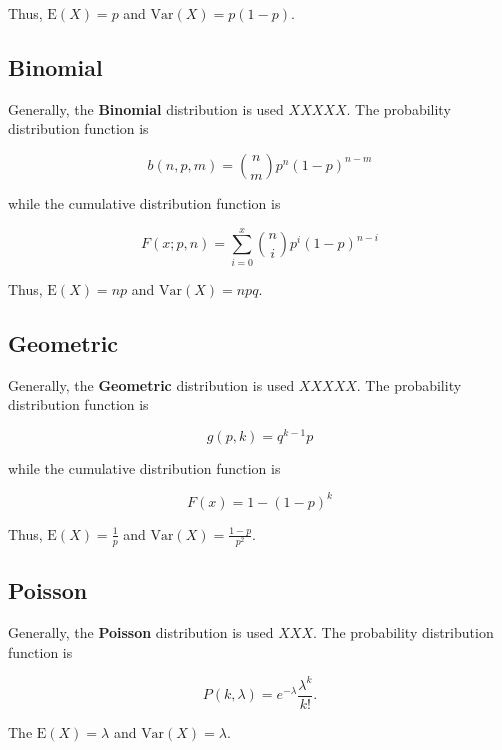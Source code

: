 \documentclass[12pt]{article}
\begin{document}
\noindent
Thus, $\text{E}(X) = p$ and $\text{Var}(X) = p(1-p)$.

\subsection*{Binomial}
\noindent
Generally, the \textbf{Binomial} distribution is used $XXXXX$. The probability distribution function is

\begin{equation*}
b(n,p,m) = {n \choose m} p^n (1-p)^{n-m}
\end{equation*}

\noindent
while the cumulative distribution function is

\begin{equation*}
F(x;p,n) = \sum_{i = 0}^{x} {n \choose i} p^i (1- p)^{n - i}
\end{equation*}

\noindent
Thus, $\text{E}(X) = np$ and $\text{Var}(X) = npq$.

\subsection*{Geometric}
\noindent
Generally, the \textbf{Geometric} distribution is used $XXXXX$. The probability distribution function is

\begin{equation*}
g(p, k) = q^{k-1} p
\end{equation*}

\noindent
while the cumulative distribution function is

\begin{equation*}
F(x) = 1- (1 - p)^{k}
\end{equation*}

\noindent
Thus, $\text{E}(X) = \frac{1}{p}$ and $\text{Var}(X) = \frac{1-p}{p^2}$.

\subsection*{Poisson}
\noindent
Generally, the \textbf{Poisson} distribution is used $XXX$. The probability distribution function is

\begin{equation*}
P(k, \lambda) = e^{- \lambda} \frac{\lambda^k}{k!}.
\end{equation*}

\noindent
The $\text{E}(X) = \lambda$ and $\text{Var}(X) = \lambda$.
\end{document}
